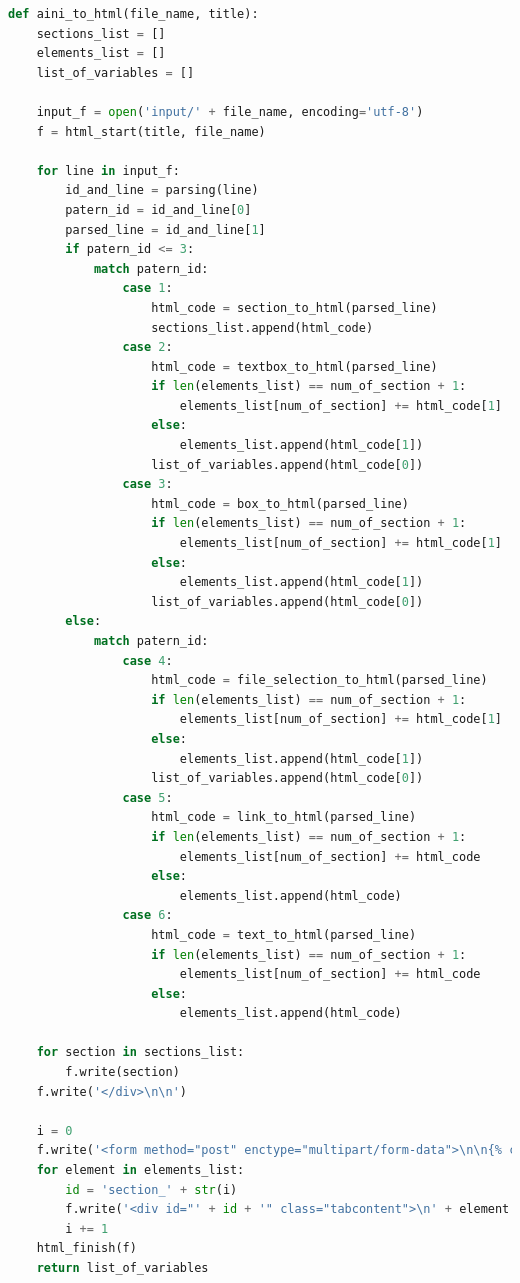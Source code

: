 \begin{lstlisting}[frame=single, label={rndhpcgui.2023.05.04.aini_to_html}, caption={Функция aini_to_html}, language={Python}] 
    def aini_to_html(file_name, title):
    sections_list = []
    elements_list = []
    list_of_variables = []

    input_f = open('input/' + file_name, encoding='utf-8')
    f = html_start(title, file_name)

    for line in input_f:
        id_and_line = parsing(line)
        patern_id = id_and_line[0]
        parsed_line = id_and_line[1]
        if patern_id <= 3:
            match patern_id:
                case 1:
                    html_code = section_to_html(parsed_line)
                    sections_list.append(html_code)
                case 2:
                    html_code = textbox_to_html(parsed_line)
                    if len(elements_list) == num_of_section + 1:
                        elements_list[num_of_section] += html_code[1]
                    else:
                        elements_list.append(html_code[1])
                    list_of_variables.append(html_code[0])
                case 3:
                    html_code = box_to_html(parsed_line)
                    if len(elements_list) == num_of_section + 1:
                        elements_list[num_of_section] += html_code[1]
                    else:
                        elements_list.append(html_code[1])
                    list_of_variables.append(html_code[0])
        else:
            match patern_id:
                case 4:
                    html_code = file_selection_to_html(parsed_line)
                    if len(elements_list) == num_of_section + 1:
                        elements_list[num_of_section] += html_code[1]
                    else:
                        elements_list.append(html_code[1])
                    list_of_variables.append(html_code[0])
                case 5:
                    html_code = link_to_html(parsed_line)
                    if len(elements_list) == num_of_section + 1:
                        elements_list[num_of_section] += html_code
                    else:
                        elements_list.append(html_code)
                case 6:
                    html_code = text_to_html(parsed_line)
                    if len(elements_list) == num_of_section + 1:
                        elements_list[num_of_section] += html_code
                    else:
                        elements_list.append(html_code)

    for section in sections_list:
        f.write(section)
    f.write('</div>\n\n')

    i = 0
    f.write('<form method="post" enctype="multipart/form-data">\n\n{% csrf_token %}\n')
    for element in elements_list:
        id = 'section_' + str(i)
        f.write('<div id="' + id + '" class="tabcontent">\n' + element + '</div>\n\n')
        i += 1
    html_finish(f)
    return list_of_variables
\end{lstlisting}


